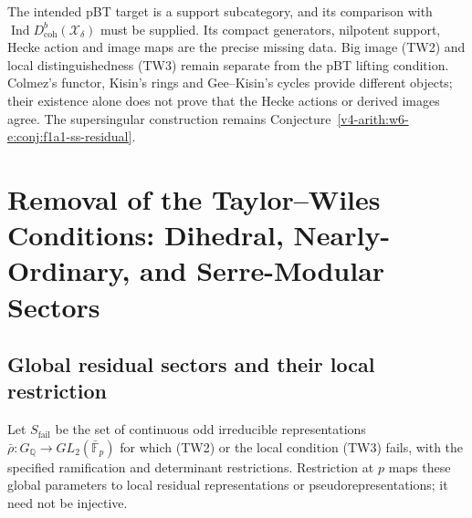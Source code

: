 The intended pBT target is a support subcategory, and its comparison
with $\operatorname{Ind}D^b_{\mathrm{coh}}(\mathcal X_\delta)$ must
be supplied. Its compact generators, nilpotent support, Hecke action
and image maps are the precise missing data. Big image (TW2) and local
distinguishedness (TW3) remain separate from the pBT lifting condition.
Colmez's functor, Kisin's rings and Gee--Kisin's cycles provide different
objects; their existence alone does not prove that the Hecke actions
or derived images agree. The supersingular construction remains
Conjecture~\ref{v4-arith:w6-e:conj:f1a1-ss-residual}.

\section{Removal of the Taylor--Wiles Conditions: Dihedral, Nearly-Ordinary, and Serre-Modular Sectors}
\label{v4-arith:w6-e:TW-removal}
\subsection{Global residual sectors and their local restriction}
Let $S_{\mathrm{fail}}$ be the set of continuous odd irreducible
representations $\bar\rho:G_{\mathbb Q}\to GL_2(\bar{\mathbb F}_p)$
for which (TW2) or the local condition (TW3) fails, with the specified
ramification and determinant restrictions. Restriction at $p$ maps
these global parameters to local residual representations or
pseudorepresentations; it need not be injective.

